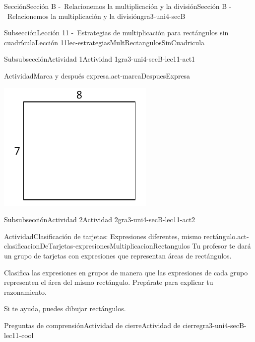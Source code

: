 \documentclass[twoside,10pt,]{article}
\begin{document}
\begin{sectionptx}{Sección}{Sección B -~Relacionemos la multiplicación y la división}{}{Sección B -~Relacionemos la multiplicación y la división}{}{}{gra3-uni4-secB}
\begin{subsectionptx}{Subsección}{Lección 11 -~Estrategias de multiplicación para rectángulos sin cuadrícula}{}{Lección 11}{}{}{lec-estrategiasMultRectangulosSinCuadricula}
\begin{subsubsectionptx}{Subsubsección}{Actividad 1}{}{Actividad 1}{}{}{gra3-uni4-secB-lec11-act1}
\begin{activity}{Actividad}{Marca y después expresa.}{act-marcaDespuesExpresa}
\begin{sidebyside}{3}{0}{0}{0}
\begin{sbspanel}{0.348}
\includegraphics[width=\linewidth]{external/svg-source/tikz-file-153086.pdf}
\end{sbspanel}%
\end{sidebyside}%
\end{activity}%
\end{subsubsectionptx}
%
%
\typeout{************************************************}
\typeout{************************************************}
%
\begin{subsubsectionptx}{Subsubsección}{Actividad 2}{}{Actividad 2}{}{}{gra3-uni4-secB-lec11-act2}
\begin{activity}{Actividad}{Clasificación de tarjetas: Expresiones diferentes, mismo rectángulo.}{act-clasificacionDeTarjetas-expresionesMultiplicacionRectangulos}%
Tu profesor te dará un grupo de tarjetas con expresiones que representan áreas de rectángulos.%
\par
Clasifica las expresiones en grupos de manera que las expresiones de cada grupo representen el área del mismo rectángulo. Prepárate para explicar tu razonamiento.%
\par
Si te ayuda, puedes dibujar rectángulos.%
\end{activity}%
\end{subsubsectionptx}
%
%
\typeout{************************************************}
\typeout{************************************************}
%
\begin{reading-questions-subsubsection}{Preguntas de comprensión}{Actividad de cierre}{}{Actividad de cierre}{}{}{gra3-uni4-secB-lec11-cool}

\end{reading-questions-subsubsection}
\end{subsectionptx}
\end{sectionptx}
\end{document}
